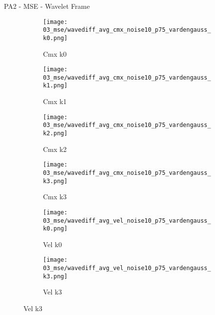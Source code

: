 \documentclass{beamer}
\begin{document}
\begin{frame}{PA2 - MSE - Wavelet Frame}{}
\begin{figure}
\begin{subfigure}{0.24\textwidth}
\texttt{[image: 03\_mse/wavediff\_avg\_cmx\_noise10\_p75\_vardengauss\_k0.png]}
\vspace{-20pt}
\caption*{\tiny Cmx k0}
\end{subfigure}
\begin{subfigure}{0.24\textwidth}
\texttt{[image: 03\_mse/wavediff\_avg\_cmx\_noise10\_p75\_vardengauss\_k1.png]}
\vspace{-20pt}
\caption*{\tiny Cmx k1}
\end{subfigure}
\begin{subfigure}{0.24\textwidth}
\texttt{[image: 03\_mse/wavediff\_avg\_cmx\_noise10\_p75\_vardengauss\_k2.png]}
\vspace{-20pt}
\caption*{\tiny Cmx k2}
\end{subfigure}
\begin{subfigure}{0.24\textwidth}
\texttt{[image: 03\_mse/wavediff\_avg\_cmx\_noise10\_p75\_vardengauss\_k3.png]}
\vspace{-20pt}
\caption*{\tiny Cmx k3}
\end{subfigure}

\begin{subfigure}{0.49\textwidth}
\texttt{[image: 03\_mse/wavediff\_avg\_vel\_noise10\_p75\_vardengauss\_k0.png]}
\vspace{-20pt}
\caption*{\tiny Vel k0}
\end{subfigure}
\begin{subfigure}{0.49\textwidth}
\texttt{[image: 03\_mse/wavediff\_avg\_vel\_noise10\_p75\_vardengauss\_k3.png]}
\vspace{-20pt}
\caption*{\tiny Vel k3}
\end{subfigure}
\end{figure}
\end{frame}
\end{document}
